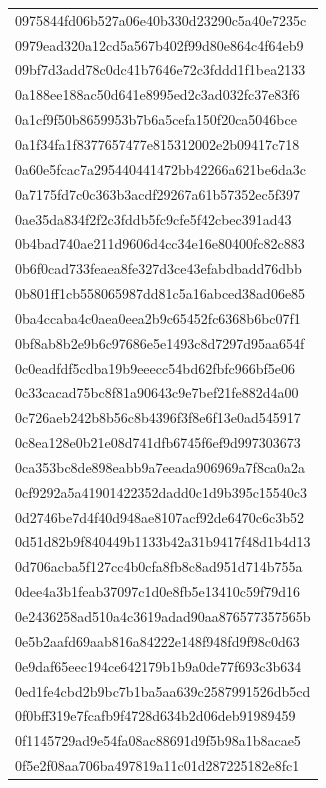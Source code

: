 \begin{tabular}{l}
0975844fd06b527a06e40b330d23290c5a40e7235c \\
0979ead320a12cd5a567b402f99d80e864c4f64eb9 \\
09bf7d3add78c0dc41b7646e72c3fddd1f1bea2133 \\
0a188ee188ac50d641e8995ed2c3ad032fc37e83f6 \\
0a1cf9f50b8659953b7b6a5cefa150f20ca5046bce \\
0a1f34fa1f8377657477e815312002e2b09417c718 \\
0a60e5fcac7a295440441472bb42266a621be6da3c \\
0a7175fd7c0c363b3acdf29267a61b57352ec5f397 \\
0ae35da834f2f2c3fddb5fc9cfe5f42cbec391ad43 \\
0b4bad740ae211d9606d4cc34e16e80400fc82c883 \\
0b6f0cad733feaea8fe327d3ce43efabdbadd76dbb \\
0b801ff1cb558065987dd81c5a16abced38ad06e85 \\
0ba4ccaba4c0aea0eea2b9c65452fc6368b6bc07f1 \\
0bf8ab8b2e9b6c97686e5e1493c8d7297d95aa654f \\
0c0eadfdf5cdba19b9eeecc54bd62fbfc966bf5e06 \\
0c33cacad75bc8f81a90643c9e7bef21fe882d4a00 \\
0c726aeb242b8b56c8b4396f3f8e6f13e0ad545917 \\
0c8ea128e0b21e08d741dfb6745f6ef9d997303673 \\
0ca353bc8de898eabb9a7eeada906969a7f8ca0a2a \\
0cf9292a5a41901422352dadd0c1d9b395c15540c3 \\
0d2746be7d4f40d948ae8107acf92de6470c6c3b52 \\
0d51d82b9f840449b1133b42a31b9417f48d1b4d13 \\
0d706acba5f127cc4b0cfa8fb8c8ad951d714b755a \\
0dee4a3b1feab37097c1d0e8fb5e13410c59f79d16 \\
0e2436258ad510a4c3619adad90aa876577357565b \\
0e5b2aafd69aab816a84222e148f948fd9f98c0d63 \\
0e9daf65eec194ce642179b1b9a0de77f693c3b634 \\
0ed1fe4cbd2b9bc7b1ba5aa639c2587991526db5cd \\
0f0bff319e7fcafb9f4728d634b2d06deb91989459 \\
0f1145729ad9e54fa08ac88691d9f5b98a1b8acae5 \\
0f5e2f08aa706ba497819a11c01d287225182e8fc1 \\

\end{tabular}
